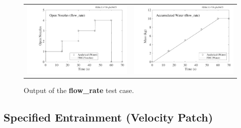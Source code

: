 \documentclass[11pt]{book}
\begin{document}
\begin{figure}[ht]
\begin{tabular*}{\textwidth}{lr}
\includegraphics[width=3.2in]{SCRIPT_FIGURES/flow_rate_open_nozzles} &
\includegraphics[width=3.2in]{SCRIPT_FIGURES/flow_rate_water_mass}
\end{tabular*}
\caption[Output of the flow rate test case.]{Output of the {\bf flow\_rate} test case.}
\label{flow_rate}
\end{figure}

\subsection{Specified Entrainment (Velocity Patch)}
\label{info:velocity_patch}
\end{document}
